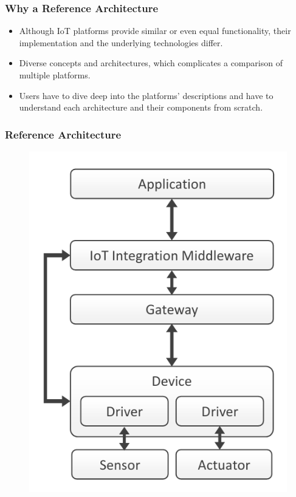 \documentclass{../iot-lecture}
\begin{document}
\begin{frame}
  \frametitle{Why a Reference Architecture}
  \begin{itemize}
    \item Although IoT platforms provide similar or even equal functionality, their implementation and the underlying technologies differ.
    \item Diverse concepts and architectures, which complicates a comparison of multiple platforms.
    \item Users have to dive deep into the platforms' descriptions and have to understand each architecture and their components from scratch.
  \end{itemize}
\end{frame}

\begin{frame}
  \frametitle{Reference Architecture}
  \begin{figure}
    \includegraphics[height=.8\textheight]{./img/iot-ref-arch.png}
  \end{figure}
\end{frame}
\end{document}
